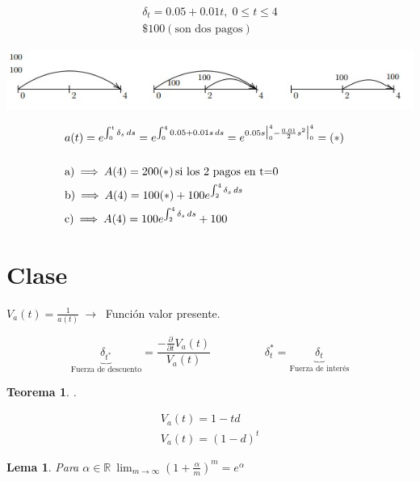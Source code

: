 \documentclass[
]{book}
\newtheorem{theorem}{Teorema}[chapter]
\newtheorem{lemma}{Lema}[chapter]
\theoremstyle{definition}
\theoremstyle{definition}
\theoremstyle{definition}
\theoremstyle{definition}
\theoremstyle{remark}
\begin{document}
\begin{align*}
&\delta_t = 0.05 + 0.01t, \; 0\leq t \leq 4&\\
&\$100(\text{son dos pagos})&
\end{align*}

\includegraphics{images/17.jpg}

\begin{align*}
&a(t) = e^{\int_{0}^{t} \delta_s \, ds} = e^{\int_{0}^{4} 0.05+0.01s \, ds} = e^{0.05s\big|_0^4 - \frac{0.01}{2}s^2\big|_0^4}=(*)&\\
&\hfill &\\
&\text{a)} \: \Longrightarrow \: A(4) = 200(*) \, \text{si los 2 pagos en t=0}&\\
&\text{b)} \: \Longrightarrow \: A(4) = 100(*) + 100e^{\int_{2}^{4} \delta_s \, ds}&\\
&\text{c)} \: \Longrightarrow \: A(4) = 100e^{\int_{2}^{4} \delta_s \, ds} +100&
\end{align*}

\hypertarget{clase-2}{%
\section{Clase}\label{clase-2}}

\(V_a(t) = \frac{1}{a(t)} \: \longrightarrow \:\) Función valor presente.

\[\underbrace{\delta_{t^{*}}}_{ \text{Fuerza de descuento}} = \frac{-\frac{\partial}{\partial t}V_a(t)}{V_a(t)} \hspace{2cm} \delta_t^* = \underbrace{\delta_t}_{\text{Fuerza de interés}}\]

\begin{theorem}
.

\begin{align*}
&V_a(t) = 1-td&\\
&V_a(t) = (1-d)^{t}&
\end{align*}
\end{theorem}

\begin{lemma}
Para \(\alpha \in \mathbb{R} \: \lim_{m \to \infty} \left(1 + \frac{\alpha}{m} \right)^{m} = e^{\alpha}\)
\end{lemma}
\end{document}
